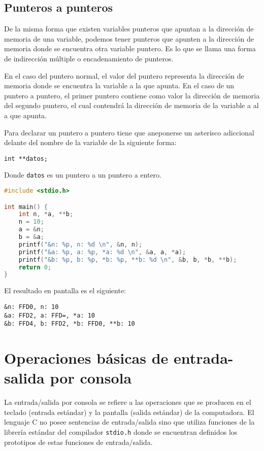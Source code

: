\subsection{Punteros a punteros}{
De la misma forma que existen variables punteros que apuntan a la dirección de memoria de una variable, podemos tener punteros que apunten a la dirección de memoria donde se encuentra otra variable puntero. Es lo que se llama una forma de indirección múltiple o encadenamiento de punteros.

En el caso del puntero normal, el valor del puntero representa la dirección de memoria donde se encuentra la variable a la que apunta. En el caso de un puntero a puntero, el primer puntero contiene como valor la dirección de memoria del segundo puntero, el cual contendrá la dirección de memoria de la variable a al a que apunta.

Para declarar un puntero a puntero tiene que aneponerse un asterisco adiccional delante del nombre de la variable de la siguiente forma:

\texttt{int **datos;}

Donde \texttt{datos} es un puntero a un puntero a entero.
\begin{Ejemplo}
\begin{lstlisting}[language=C]
#include <stdio.h>

int main() {
    int n, *a, **b;
    n = 10;
    a = &n;
    b = &a;
    printf("&n: %p, n: %d \n", &n, n);
    printf("&a: %p, a: %p, *a: %d \n", &a, a, *a);
    printf("&b: %p, b: %p, *b: %p, **b: %d \n", &b, b, *b, **b);
    return 0;
}
\end{lstlisting}
El resultado en pantalla es el siguiente:

\texttt{\&n: FFD0, n: 10}\\
\texttt{\&a: FFD2, a: FFD=, *a: 10}\\
\texttt{\&b: FFD4, b: FFD2, *b: FFD0, **b: 10}\\
\end{Ejemplo}
}
\section{Operaciones básicas de entrada-salida por consola}
La entrada/salida por consola se refiere a las operaciones que se producen en el teclado (entrada estándar) y la pantalla (salida estándar) de la computadora. El lenguaje C no posee sentencias de entrada/salida sino que utiliza funciones de la librería estándar del compilador \texttt{stdio.h} donde se encuentran definidos los prototipos de estas funciones de entrada/salida.
